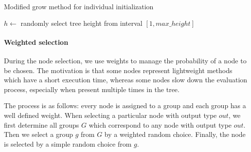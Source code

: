 \begin{algorithm}[t]
\DontPrintSemicolon 
\caption{Modified grow method for individual initialization\label{alg:ourgrow}}
  \;
  $h \longleftarrow$ randomly select tree height from interval $[1, max\_height]$ \label{alg:ourgrow:height}
  \;  
  
  \;
  
\end{algorithm}

\paragraph{Weighted selection}
During the node selection, we use weights to manage the probability of a node
to be chosen. The motivation is that some nodes represent lightweight methods
which have a short execution time, whereas some nodes slow down the evaluation
process, especially when present multiple times in the tree.

The process is as follows: every node is assigned to a group and each group has
a well defined weight. When selecting a particular node with output type $out$, we 
first determine all groups $G$ which correspond to any node with output type
$out$. Then we select a group $g$ from $G$ by a weighted random choice.
Finally, the node is selected by a simple random choice from $g$.

